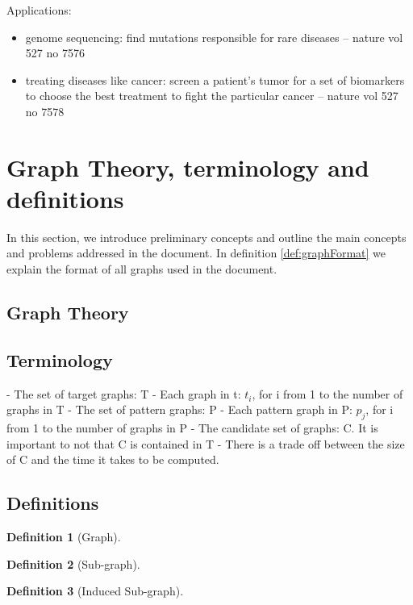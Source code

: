 \documentclass{l4proj}
\newtheorem{definition}{Definition}
\begin{document}
        Applications:
        \begin{itemize}
        \item genome sequencing: find mutations responsible for rare diseases -- nature vol 527 no 7576
        \item treating diseases like cancer: screen a patient's tumor for a set of biomarkers to choose the best treatment to fight the particular cancer -- nature vol 527 no 7578
        \end{itemize}
        
\section{Graph Theory, terminology and definitions}
        In this section, we introduce preliminary concepts and outline the main concepts and problems addressed in the document. In definition \ref{def:graphFormat} we explain the format of all graphs used in the document.
    \subsection{Graph Theory}
    \subsection{Terminology}
    \label{naming}
    - The set of target graphs: T
    - Each graph in t: $t^{}_i$, for i from 1 to the number of graphs in T
    - The set of pattern graphs: P
    - Each pattern graph in P: $p^{}_j$, for i from 1 to the number of graphs in P
    - The candidate set of graphs: C. It is important to not that C is contained in T
    - There is a trade off between the size of C and the time it takes to be computed.
        
	\subsection{Definitions}
    \label{subsec:definitions}
        \begin{definition}[Graph]
        
        \end{definition}
        
        \begin{definition}[Sub-graph]
        \label{def:subgraph}
        
        \end{definition}
        
        \begin{definition}[Induced Sub-graph]
        \label{def:induced-subgraph}
        
        \end{definition}
    
\end{document}
